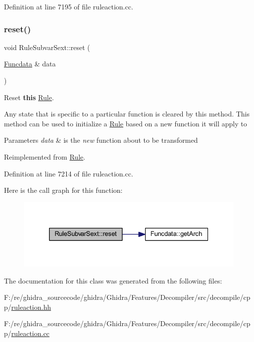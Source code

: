 Definition at line 7195 of file ruleaction.\+cc.

\mbox{\label{class_rule_subvar_sext_a49bc2d4beb4624eda70e07f702aa39ab}} 
\subsubsection{\texorpdfstring{reset()}{reset()}}
{\footnotesize\ttfamily void Rule\+Subvar\+Sext\+::reset (\begin{DoxyParamCaption}\item[{\mbox{\hyperlink{class_funcdata}{Funcdata}} \&}]{data }\end{DoxyParamCaption})\hspace{0.3cm}{\ttfamily [virtual]}}



Reset {\bfseries{this}} \mbox{\hyperlink{class_rule}{Rule}}. 

Any state that is specific to a particular function is cleared by this method. This method can be used to initialize a \mbox{\hyperlink{class_rule}{Rule}} based on a new function it will apply to 
\begin{DoxyParams}{Parameters}
{\em data} & is the {\itshape new} function about to be transformed \\
\hline
\end{DoxyParams}


Reimplemented from \mbox{\hyperlink{class_rule_a1f074d593a6fefc79a5c07e4b3e13674}{Rule}}.



Definition at line 7214 of file ruleaction.\+cc.

Here is the call graph for this function\+:
\nopagebreak
\begin{figure}[H]
\begin{center}
\leavevmode
\includegraphics[width=326pt]{class_rule_subvar_sext_a49bc2d4beb4624eda70e07f702aa39ab_cgraph}
\end{center}
\end{figure}


The documentation for this class was generated from the following files\+:\begin{DoxyCompactItemize}
\item 
F\+:/re/ghidra\+\_\+sourcecode/ghidra/\+Ghidra/\+Features/\+Decompiler/src/decompile/cpp/\mbox{\hyperlink{ruleaction_8hh}{ruleaction.\+hh}}\item 
F\+:/re/ghidra\+\_\+sourcecode/ghidra/\+Ghidra/\+Features/\+Decompiler/src/decompile/cpp/\mbox{\hyperlink{ruleaction_8cc}{ruleaction.\+cc}}\end{DoxyCompactItemize}
